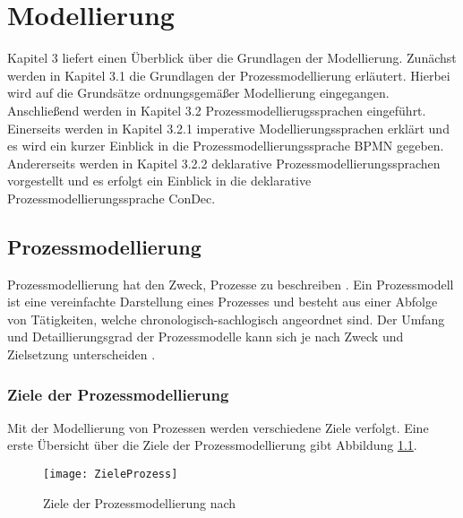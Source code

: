 
\chapter{Modellierung}\label{sec:chapter3}
Kapitel 3 liefert einen Überblick über die Grundlagen der Modellierung. Zunächst werden in Kapitel 3.1 die Grundlagen der Prozessmodellierung erläutert. Hierbei wird auf die Grundsätze ordnungsgemäßer Modellierung eingegangen. Anschließend werden in Kapitel 3.2 Prozessmodellierugssprachen eingeführt. Einerseits werden in Kapitel 3.2.1 imperative Modellierungssprachen erklärt und es wird ein kurzer Einblick in die Prozessmodellierungssprache BPMN gegeben. Andererseits werden in Kapitel 3.2.2 deklarative Prozessmodellierungssprachen vorgestellt und es erfolgt ein Einblick in die deklarative Prozessmodellierungssprache ConDec.

\section{Prozessmodellierung}\label{sec:chapter3:Prozessmodellierung}

Prozessmodellierung hat den Zweck, Prozesse zu beschreiben \cite{fahland2009}. Ein Prozessmodell ist eine vereinfachte Darstellung eines Prozesses und besteht aus einer Abfolge von Tätigkeiten, welche chronologisch-sachlogisch angeordnet sind. Der Umfang und Detaillierungsgrad der Prozessmodelle kann sich je nach Zweck und Zielsetzung unterscheiden \cite{koch2011}.

\subsection{Ziele der Prozessmodellierung}
Mit der Modellierung von Prozessen werden verschiedene Ziele verfolgt. Eine erste Übersicht über die Ziele der Prozessmodellierung gibt Abbildung \ref{fig:ZieleProzess}.
\begin{figure}[htp]
\begin{center}
  \texttt{[image: ZieleProzess]} %
  \caption{Ziele der Prozessmodellierung nach \cite{koch2011}}
  \label{fig:ZieleProzess}
\end{center}
\end{figure}

